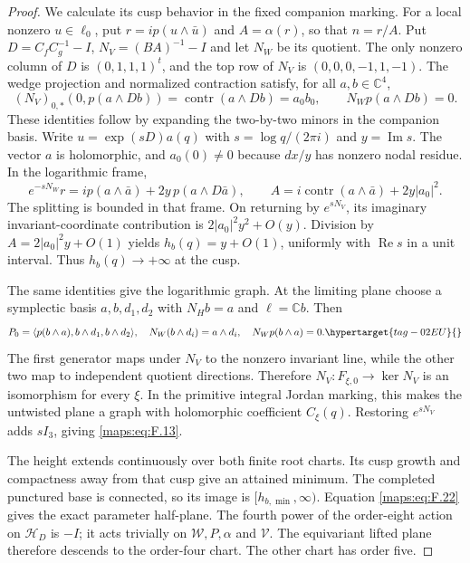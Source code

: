 \begin{proof}
We calculate its cusp behavior in the fixed companion marking.
For a local nonzero $u\in\ell_0$, put $r=ip(u\wedge\bar u)$
and $A=\alpha(r)$, so that $n=r/A$.
Put $D=C_fC_g^{-1}-I$, $N_V=(BA)^{-1}-I$ and let $N_W$ be its
quotient. The only nonzero column of $D$ is
$(0,1,1,1)^t$, and the top row of $N_V$ is
$(0,0,0,-1,1,-1)$. The wedge projection and normalized contraction
satisfy, for all $a,b\in\mathbb C^4$,
\[
 (N_V)_{0,*}(0,p(a\wedge Db))
 =\operatorname{contr}(a\wedge Db)=a_0b_0,
 \qquad N_Wp(a\wedge Db)=0.
\]
These identities follow by expanding the two-by-two minors in
the companion basis. Write $u=\exp(sD)a(q)$ with
$s=\log q/(2\pi i)$ and $y=\operatorname{Im}s$.
The vector $a$ is holomorphic, and $a_0(0)\ne0$ because
$dx/y$ has nonzero nodal residue. In the logarithmic frame,
\[
 e^{-sN_W}r=ip(a\wedge\bar a)+2y\,p(a\wedge D\bar a),
 \qquad
 A=i\operatorname{contr}(a\wedge\bar a)+2y|a_0|^2.
\]
The splitting is bounded in that frame. On returning by
$e^{sN_V}$, its imaginary invariant-coordinate contribution is
$2|a_0|^2y^2+O(y)$. Division by
$A=2|a_0|^2y+O(1)$ yields
$h_b(q)=y+O(1)$, uniformly with $\operatorname{Re}s$ in a unit
interval. Thus $h_b(q)\to+\infty$ at the cusp.

The same identities give the logarithmic graph. At the limiting
plane choose a symplectic basis $a,b,d_1,d_2$ with $N_Hb=a$
and $\ell=\mathbb Cb$. Then
\begin{equation}
 P_0=\langle p(b\wedge a),b\wedge d_1,b\wedge d_2\rangle,
 \quad N_W(b\wedge d_i)=a\wedge d_i,
 \quad N_Wp(b\wedge a)=0.
 \hypertarget{tag-02EU}{}\label{maps:eq:F.23}
\end{equation}
The first generator maps under $N_V$ to the nonzero invariant
line, while the other two map to independent quotient directions.
Therefore $N_V:F_{\xi,0}\to\ker N_V$ is an isomorphism for
every $\xi$. In the primitive integral Jordan marking, this
makes the untwisted plane a graph with holomorphic coefficient
$C_\xi(q)$. Restoring $e^{sN_V}$ adds $sI_3$, giving
\eqref{maps:eq:F.13}.

The height extends continuously over both finite root charts.
Its cusp growth and compactness away from that cusp give an
attained minimum. The completed punctured base is connected, so
its image is $[h_{b,\min},\infty)$. Equation
\eqref{maps:eq:F.22} gives the exact parameter half-plane.
The fourth power of the order-eight action on $\mathcal H_D$
is $-I$; it acts trivially on $\mathcal W,P,\alpha$ and
$\mathcal V$. The equivariant lifted plane therefore descends
to the order-four chart. The other chart has order five.
\end{proof}
